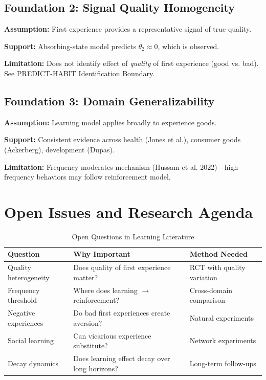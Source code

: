 \documentclass[11pt, a4paper]{article}
\begin{document}
\subsection{Foundation 2: Signal Quality Homogeneity}

\textbf{Assumption:} First experience provides a representative signal of true quality.

\textbf{Support:} Absorbing-state model predicts $\theta_2 \approx 0$, which is observed.

\textbf{Limitation:} Does not identify effect of \textit{quality} of first experience (good vs. bad). See PREDICT-HABIT Identification Boundary.

\subsection{Foundation 3: Domain Generalizability}

\textbf{Assumption:} Learning model applies broadly to experience goods.

\textbf{Support:} Consistent evidence across health (Jones et al.), consumer goods (Ackerberg), development (Dupas).

\textbf{Limitation:} Frequency moderates mechanism (Hussam et al. 2022)---high-frequency behaviors may follow reinforcement model.


\section{Open Issues and Research Agenda}
\label{sec:lrn-open}

\begin{table}[htbp]
\centering
\caption{Open Questions in Learning Literature}
\label{tab:lrn-open}
\renewcommand{\arraystretch}{1.3}
\begin{tabular}{@{}p{4cm}p{5cm}p{3cm}@{}}
\toprule
\textbf{Question} & \textbf{Why Important} & \textbf{Method Needed} \\
\midrule
Quality heterogeneity & Does quality of first experience matter? & RCT with quality variation \\
Frequency threshold & Where does learning $\to$ reinforcement? & Cross-domain comparison \\
Negative experiences & Do bad first experiences create aversion? & Natural experiments \\
Social learning & Can vicarious experience substitute? & Network experiments \\
Decay dynamics & Does learning effect decay over long horizons? & Long-term follow-ups \\
\bottomrule
\end{tabular}
\end{table}
\end{document}
